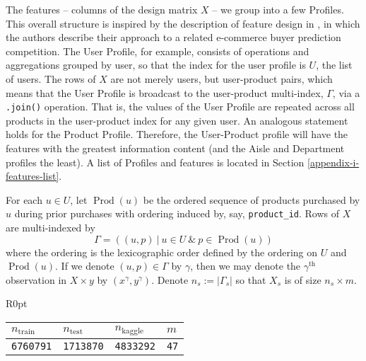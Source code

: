 \documentclass[11pt]{article}
\theoremstyle{definition}
\numberwithin{equation}{section}
\begin{document}
The features -- columns of the design matrix \(X\) -- we group into a few Profiles.
This overall structure is inspired by the description of feature design
in \cite{liuRepeatBuyerPrediction2016}, in which the authors describe
their approach to a related e-commerce buyer prediction competition. The
User Profile, for example, consists of operations and aggregations
grouped by user, so that the index for the user profile is \(U\), the
list of users. The rows of \(X\) are not merely users, but user-product
pairs, which means that the User Profile is broadcast to the
user-product multi-index, \(\Gamma\), via a \texttt{.join()} operation.
That is, the values of the User Profile are repeated across all products
in the user-product index for any given user. An analogous statement
holds for the Product Profile. Therefore, the User-Product profile will
have the features with the greatest information content (and the Aisle
and Department profiles the least). A list of Profiles and features is
located in Section \ref{appendix-i-features-list}.

For each \(u \in U\), let \(\mathop{\mathrm{Prod}} (u)\) be the ordered
sequence of products purchased by \(u\) during prior purchases with
ordering induced by, say, \texttt{product\_id}. Rows of \(X\) are
multi-indexed by
\begin{equation}
  \Gamma = \left( (u, p) \ | \ u \in U \ \& \ p \in \mathop{\mathrm{Prod}} (u) \right)
\end{equation}
where the ordering is the lexicographic order defined by
the ordering on \(U\) and \(\mathop{\mathrm{Prod}} (u)\). If we denote
\((u, p) \in \Gamma\) by \(\gamma\), then we may denote the
\(\gamma^{\text{th}}\) observation in \(X \times y\) by \( (x^\gamma, y^\gamma) \). Denote
\(n_s := | \Gamma_s |\) so that \(X_s\) is of size \(n_s \times m\). 


\begin{wraptable}[5]{R}{0pt}
\begin{tabular}{llll}
  \toprule
  \(n_\text{train}\) & \(n_\text{test}\) & \(n_\text{kaggle}\) &
  \(m\) \\
  \midrule
  \texttt{6760791}            & \texttt{1713870}           & \texttt{4833292}             & \texttt{47} \\
  \bottomrule
\end{tabular}
\end{wraptable}
\end{document}
